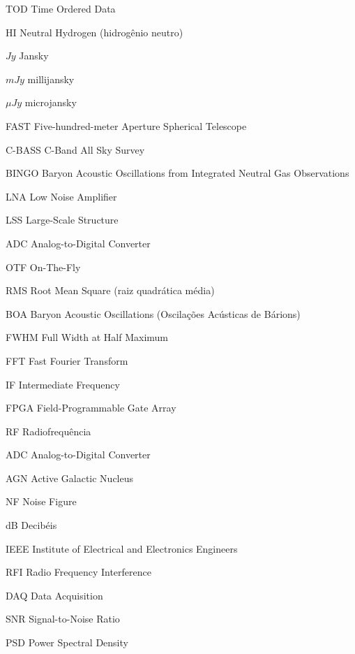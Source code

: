 
\begin{siglas}
  \item[TOD] Time Ordered Data
  \item[HI] Neutral Hydrogen (hidrogênio neutro)
  \item[\(Jy\)] Jansky
  \item[\(mJy\)] millijansky
  \item[\(\mu Jy\)] microjansky
  \item[FAST] Five-hundred-meter Aperture Spherical Telescope
  \item[C-BASS] C-Band All Sky Survey
  \item[BINGO] Baryon Acoustic Oscillations from Integrated Neutral Gas Observations
  \item[LNA] Low Noise Amplifier
  \item[LSS] Large-Scale Structure
  \item[ADC] Analog-to-Digital Converter
  \item[OTF] On-The-Fly
  \item[RMS] Root Mean Square (raiz quadrática média)
  \item[BOA] Baryon Acoustic Oscillations (Oscilações Acústicas de Bárions)
  \item[FWHM] Full Width at Half Maximum
  \item[FFT] Fast Fourier Transform
  \item[IF] Intermediate Frequency
  \item[FPGA] Field-Programmable Gate Array
  \item[RF] Radiofrequência
  \item[ADC] Analog-to-Digital Converter
  \item[AGN] Active Galactic Nucleus 
  \item[NF] Noise Figure 
  \item[dB] Decibéis
  \item[IEEE] Institute of Electrical and Electronics Engineers 
  \item[RFI] Radio Frequency Interference
  \item[DAQ] Data Acquisition
  \item[SNR] Signal-to-Noise Ratio
  \item[PSD] Power Spectral Density 
\end{siglas}

